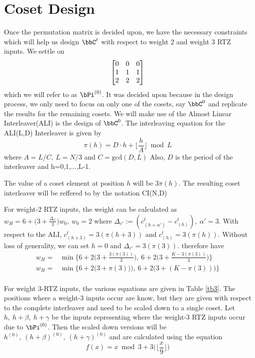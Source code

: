 \documentclass[11pt, oneside, dvipdfmx]{book}
\begin{document}
\section{Coset Design}
Once the permutation matrix is decided upon, we have the necessary constraints which will help us design $\bbC^t$ with respect to weight $2$ and weight $3$ RTZ inputs.
We settle on $$\begin{bmatrix} 0 & 0 & 0 \cr 1 & 1 & 1 \cr 2 & 2 & 2\end{bmatrix}$$ which we will refer to as $\bPi^{(0)}$. It was decided upon because in the design process, we only need to focus on only one of the cosets, say $\bbC^0$ and replicate the results for the remaining cosets. We will make use of the Almost Linear Interleaver(ALI) is the design of $\bbC^0$. 
The interleaving equation for the ALI(L,D) Interleaver is given by $$\pi(h)=D \cdot h + \Big\lfloor \frac{h}{A} \Big\rfloor \bmod L$$ where $A=L/C,~L=N/3$ and $C=\text{gcd}(D,L)$ Also, $D$ is the period of the interleaver and h=0,1,...,L-1.

The value of a coset element at position $h$ will be $3\pi(h)$. The resulting coset interleaver will be reffered to by the notation CI(N,D)

For weight-$2$ RTZ inputs, the weight can be calculated as
$
w_H=6+\Big(3+\frac{\Delta_{c'}}{3}\Big)w_0,~w_0=2
$ 
where
$\Delta_{c'}:=(c_{(h+\alpha')}^{t}-c_{(h)}^{t}),~\alpha' =3$. 
 With respect to the ALI, $c_{(h+3)}^{t}=3(\pi(h+3))$ and $c_{(h)}^{t}=3(\pi(h))$.
 Without loss of generality, we can set $h=0$ and $\Delta_{c'}=3(\pi(3))$. therefore have 
 \begin{equation}
 \begin{split}
 w_H=&\min \Bigg\{6+2\Big(3+\frac{3(\pi(3))}{3}\Big),~6+2\Big(3+\frac{K-3(\pi(3))}{3}\Big)\Bigg\}\\
  w_H=&\min \Bigg\{6+2\Big(3+\pi(3))\Big),~6+2\Big(3+(K-\pi(3))\Big)\Bigg\}\\
 \end{split}
 \label{eq8}
 \end{equation}
 
 For weight $3$-RTZ inputs, the various equations are given in Table \ref{tb3}. The positions where a weight-$3$ inputs occur are know, but they are given with respect to the complete interleaver and need to be scaled down to a single coset. 
 Let $h,~h+\beta,~h+\gamma$ be the inputs representing where the weight-$3$ RTZ inputs occur due to $\bPi^{(0)}$. Then the scaled down versions will be $h^{(0)},~(h+\beta)^{(0)},~(h+\gamma)^{(0)}$ and are calculated using the equation
 \begin{equation}
 f(x)= x \bmod 3 + 3\Big(\Big\lfloor\frac{x}{9} \Big\rfloor\Big)
 \label{eq9}
 \end{equation}
 
\end{document}
